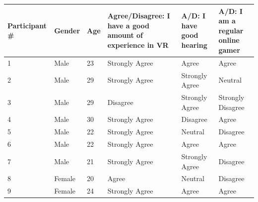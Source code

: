 \begin{appendices}
\begin{table}[]
	\begin{tabular}{|l|l|l|l|l|l|}
		\hline
		\textbf{Participant \#} & \textbf{Gender} & \textbf{Age} & \textbf{Agree/Disagree: I have a good amount of experience in VR} & \textbf{A/D: I have good hearing} & \textbf{A/D: I am a regular online gamer} \\ \hline
		1                       & Male            & 23           & Strongly Agree                                                    & Agree                             & Agree                                     \\ \hline
		2                       & Male            & 29           & Strongly Agree                                                    & Strongly Agree                    & Neutral                                   \\ \hline
		3                       & Male            & 29           & Disagree                                                          & Strongly Agree                    & Strongly Disagree                         \\ \hline
		4                       & Male            & 30           & Strongly Agree                                                    & Disagree                          & Agree                                     \\ \hline
		5                       & Male            & 22           & Strongly Agree                                                    & Neutral                           & Disagree                                  \\ \hline
		6                       & Male            & 22           & Strongly Agree                                                    & Agree                             & Agree                                     \\ \hline
		7                       & Male            & 21           & Strongly Agree                                                    & Strongly Agree                    & Disagree                                  \\ \hline
		8                       & Female          & 20           & Agree                                                             & Neutral                           & Disagree                                  \\ \hline
		9                       & Female          & 24           & Strongly Agree                                                    & Agree                             & Agree                                     \\ \hline

\end{tabular}
\end{table}
\end{appendices}
